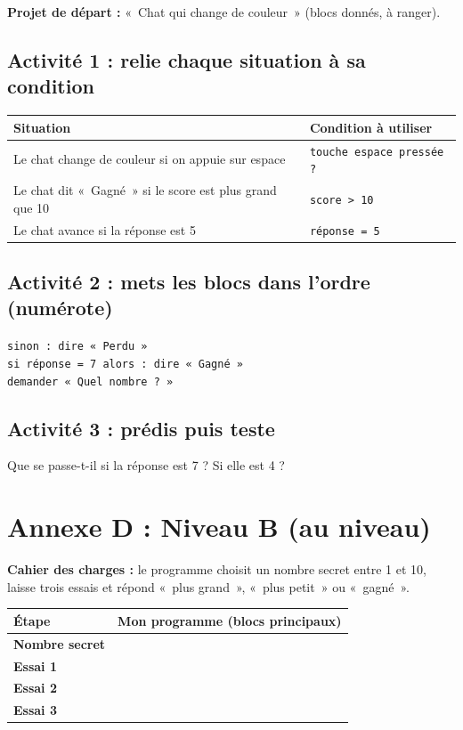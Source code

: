 \documentclass[11pt,a4paper]{article}
\begin{document}
\textbf{Projet de départ :} «~Chat qui change de couleur~» (blocs donnés, à ranger).

\subsection*{Activité 1 : relie chaque situation à sa condition}
\begin{tabularx}{\linewidth}{Y Y}
\toprule
\textbf{Situation} & \textbf{Condition à utiliser}\\
\midrule
Le chat change de couleur si on appuie sur espace & \texttt{touche espace pressée ?}\\
Le chat dit «~Gagné~» si le score est plus grand que 10 & \texttt{score > 10}\\
Le chat avance si la réponse est 5 & \texttt{réponse = 5}\\
\bottomrule
\end{tabularx}

\subsection*{Activité 2 : mets les blocs dans l'ordre (numérote)}
\dotfill{} \texttt{sinon : dire «~Perdu~»}\\
\dotfill{} \texttt{si réponse = 7 alors : dire «~Gagné~»}\\
\dotfill{} \texttt{demander «~Quel nombre ?~»}

\subsection*{Activité 3 : prédis puis teste}
Que se passe-t-il si la réponse est 7 ? \dotfill\quad Si elle est 4 ? \dotfill

\newpage
\section*{Annexe D : Niveau B (au niveau)}

\textbf{Cahier des charges :} le programme choisit un nombre secret entre 1 et 10, laisse trois essais et répond «~plus grand~», «~plus petit~» ou «~gagné~».

\begin{tabularx}{\linewidth}{>{\bfseries}p{4cm}Y}
\toprule
Étape & Mon programme (blocs principaux)\\
\midrule
Nombre secret & \\
Essai 1 & \\
Essai 2 & \\
Essai 3 & \\
\bottomrule
\end{tabularx}
\end{document}
